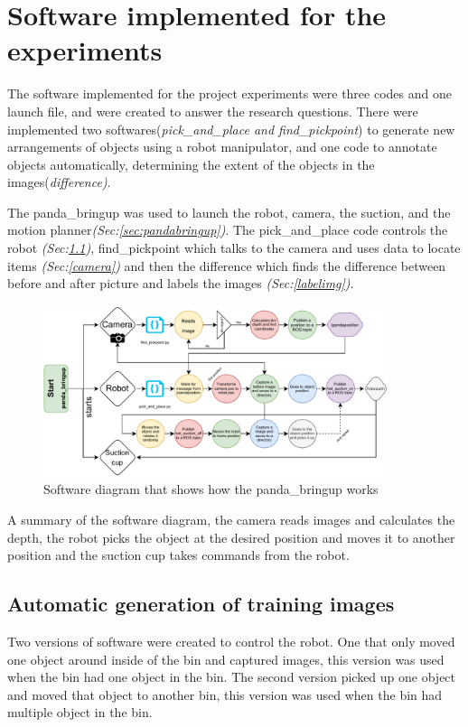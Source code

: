\section{Software implemented for the experiments}
The software implemented for the project experiments were three codes and one launch file, and were created to answer the research questions. There were implemented two softwares(\textit{pick\_and\_place and find\_pickpoint}) to generate new arrangements of objects using a robot manipulator, and one code to annotate objects automatically, determining the extent of the objects in the images(\textit{difference)}.

The panda\_bringup was used to launch the robot, camera, the suction, and the motion planner\textit{(Sec:\ref{sec:pandabringup})}. 
The pick\_and\_place code controls the robot \textit{(Sec:\ref{sec:robot})}, find\_pickpoint which talks to the camera and uses data to locate items \textit{(Sec:\ref{camera})} and then the difference which finds the difference between before and after picture and labels the images \textit{(Sec:\ref{labelimg})}.

\begin{figure}[h]
    \centering
    \includegraphics[width=0.9\textwidth]{graphics/softwareDiagram.pdf}
    \caption{Software diagram that shows how the panda\_bringup works}
    \label{fig:softwarediagram}
\end{figure}

A summary of the software diagram, the camera reads images and calculates the depth, the robot picks the object at the desired position and moves it to another position and the suction cup takes commands from the robot.

\subsection{Automatic generation of training images}\label{sec:robot}
Two versions of software were created to control the robot. One that only moved one object around inside of the bin and captured images, this version was used when the bin had one object in the bin. The second version picked up one object and moved that object to another bin, this version was used when the bin had multiple object in the bin.

